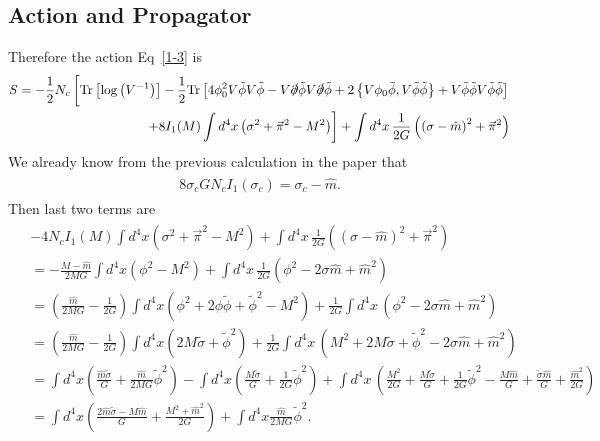 \documentclass[tightenlines,floatfix,nofootinbib,superscriptaddress,fleqn]{revtex4-2}
\begin{document}
\subsection{Action and Propagator}
Therefore the action Eq~\eqref{1-3} is
\begin{align}\label{1-1-8}
  \begin{split}
    S=-\frac{1}{2}N_c\left[\mathrm{Tr}
    \left[\log\left(V^{-1}\right)\right]
    -\frac{1}{2}\mathrm{Tr}\left[
      4\phi_0^2V\tilde{\phi}V\tilde{\phi}
      -V\slashed{\partial}\tilde{\phi}
       V\slashed{\partial}\tilde{\phi}
      +2\left\{V\phi_0\tilde{\phi},V\tilde{\phi}\tilde{\phi}
      \right\}
      +V\tilde{\phi}\tilde{\phi}V\tilde{\phi}\tilde{\phi}
      \right]\right.\\
      \,\,\,\,\,\left.
        +8I_1(M)\int d^4x\left(\sigma^2+\vec{\pi}^2-M^2\right)\right]
        +\int d^4x\,\frac{1}{2G}\left(\left(\sigma-\hat{m}\right)^2+\vec{\pi}^2\right)
      \end{split}
\end{align}
We already know from the previous calculation in the paper that
\begin{align}
  \begin{split}
    8\sigma_c G N_cI_1(\sigma_c)=\sigma_c-\hat{m}.
  \end{split}
\end{align}
Then last two terms are
\begin{align}
  \begin{split}
    &-4N_cI_1(M)\int d^4x\left(\sigma^2+\vec{\pi}^2-M^2\right)
        +\int d^4x\,\frac{1}{2G}\left(\left(\sigma-\hat{m}\right)^2+\vec{\pi}^2\right)  \\
    &=-\frac{M-\hat{m}}{2MG}\int d^4x\left(\phi^2-M^2\right)
    +\int d^4x\,\frac{1}{2G}\left(\phi^2 -2\sigma\hat{m}+\hat{m}^2\right) \\
    &=\left(\frac{\hat{m}}{2MG}-\frac{1}{2G}\right)\int d^4x\left(
      \phi^2+2\phi\tilde{\phi}+\tilde{\phi}^2-M^2\right)
    +\frac{1}{2G}\int d^4x\,\left(\phi^2 -2\sigma\hat{m}+\hat{m}^2\right) \\
    &=\left(\frac{\hat{m}}{2MG}-\frac{1}{2G}\right)\int d^4x\left(
      2M\tilde{\sigma}+\tilde{\phi}^2\right)
    +\frac{1}{2G}\int d^4x\,\left(M^2+2M\tilde{\sigma}+\tilde{\phi}^2 
    -2\sigma\hat{m}+\hat{m}^2\right) \\
    &=\int d^4x\left(
      \frac{\hat{m}\tilde{\sigma}}{G}+\frac{\hat{m}}{2MG}\tilde{\phi}^2\right)
      -\int d^4x\left(\frac{M\tilde{\sigma}}{G}+\frac{1}{2G}\tilde{\phi}^2\right)
    +\int d^4x\,\left(\frac{M^2}{2G}+\frac{M\tilde{\sigma}}{G}+\frac{1}{2G}\tilde{\phi}^2 
    -\frac{M\hat{m}}{G}+\frac{\tilde{\sigma}\hat{m}}{G}+\frac{\hat{m}^2}{2G}\right) \\
    &=\int d^4x\left(
      \frac{2\hat{m}\tilde{\sigma}-M\hat{m}}{G}
      +\frac{M^2+\hat{m}^2}{2G}\right)
      +\int d^4x\frac{\hat{m}}{2MG}\tilde{\phi}^2.
  \end{split}
\end{align}
\end{document}
